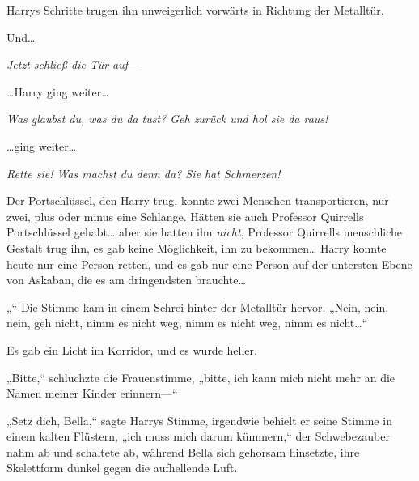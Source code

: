 Harrys Schritte trugen ihn unweigerlich vorwärts in Richtung der Metalltür.

Und…

\emph{Jetzt schließ die Tür auf—}

…Harry ging weiter…

\emph{Was glaubst du, was du da tust? Geh zurück und hol sie da raus!}

…ging weiter…

\emph{Rette sie! Was machst du denn da? Sie hat Schmerzen! }

Der Portschlüssel, den Harry trug, konnte zwei Menschen transportieren, nur zwei, plus oder minus eine Schlange. Hätten sie auch Professor Quirrells Portschlüssel gehabt… aber sie hatten ihn \emph{nicht}, Professor Quirrells menschliche Gestalt trug ihn, es gab keine Möglichkeit, ihn zu bekommen… Harry konnte heute nur eine Person retten, und es gab nur eine Person auf der untersten Ebene von Askaban, die es am dringendsten brauchte…

„“ Die Stimme kam in einem Schrei hinter der Metalltür hervor. „Nein, nein, nein, geh nicht, nimm es nicht weg, nimm es nicht weg, nimm es nicht…“

Es gab ein Licht im Korridor, und es wurde heller.

„Bitte,“ schluchzte die Frauenstimme, „bitte, ich kann mich nicht mehr an die Namen meiner Kinder erinnern—“

„Setz dich, Bella,“ sagte Harrys Stimme, irgendwie behielt er seine Stimme in einem kalten Flüstern, „ich muss mich darum kümmern,“ der Schwebezauber nahm ab und schaltete ab, während Bella sich gehorsam hinsetzte, ihre Skelettform dunkel gegen die aufhellende Luft.

